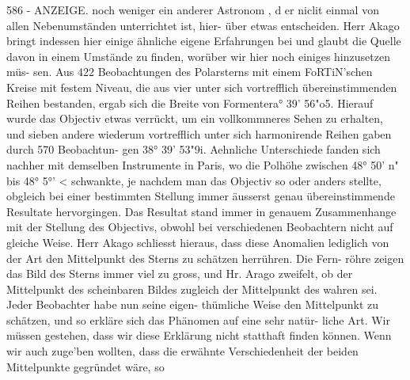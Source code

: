 \documentclass[12pt,a4paper]{article}
\begin{document}
\newpage
586 - ANZEIGE.\newline
noch weniger ein anderer Astronom , d er niclit einmal von allen Nebenumständen unterrichtet ist, hier-\newline
über etwas entscheiden. Herr Akago bringt indessen hier einige ähnliche eigene Erfahrungen bei und\newline
glaubt die Quelle davon in einem Umstände zu finden, worüber wir hier noch einiges hinzusetzen müs-\newline
sen. Aus 422 Beobachtungen des Polarsterns mit einem FoRTiN'schen Kreise mit festem Niveau, die aus\newline
vier unter sich vortrefflich übereinstimmenden Reihen bestanden, ergab sich die Breite von Formentera° 39' 56"o5. Hierauf wurde das Objectiv etwas verrückt, um ein vollkommneres Sehen zu erhalten,\newline
und sieben andere wiederum vortrefflich unter sich harmonirende Reihen gaben durch 570 Beobachtun-\newline
gen 38° 39' 53"9i. Aehnliche Unterschiede fanden sich nachher mit demselben Instrumente in Paris,\newline
wo die Polhöhe zwischen 48° 50' n" bis 48° 5°' < schwankte, je nachdem man das Objectiv so oder\newline
anders stellte, obgleich bei einer bestimmten Stellung immer äusserst genau übereinstimmende Resultate\newline
hervorgingen. Das Resultat stand immer in genauem Zusammenhange mit der Stellung des Objectivs,\newline
obwohl bei verschiedenen Beobachtern nicht auf gleiche Weise. Herr Akago schliesst hieraus, dass\newline
diese Anomalien lediglich von der Art den Mittelpunkt des Sterns zu schätzen herrühren. Die Fern-\newline
röhre zeigen das Bild des Sterns immer viel zu gross, und Hr. Arago zweifelt, ob der Mittelpunkt des\newline
scheinbaren Bildes zugleich der Mittelpunkt des wahren sei. Jeder Beobachter habe nun seine eigen-\newline
thümliche Weise den Mittelpunkt zu schätzen, und so erkläre sich das Phänomen auf eine sehr natür-\newline
liche Art. Wir müssen gestehen, dass wir diese Erklärung nicht statthaft finden können. Wenn wir\newline
auch zuge'ben wollten, dass die erwähnte Verschiedenheit der beiden Mittelpunkte gegründet wäre, so\newline
\end{document}
